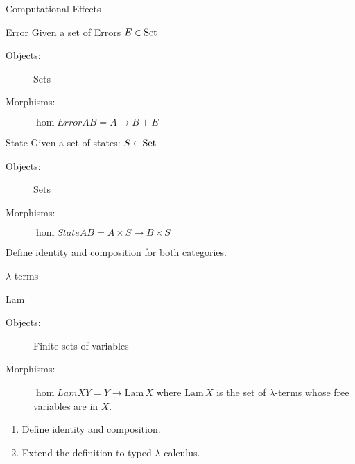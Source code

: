 \documentclass[handout]{beamer}
\begin{document}
\begin{frame}{Computational Effects}

  \begin{block}{Error}
    Given a set of Errors $E\in\mathrm{Set}$
    \begin{description}
    \item[Objects:] Sets
    \item[Morphisms:] $\hom{Error}{A}{B} = A \to B+E$
    \end{description}
  \end{block}

  \pause
  \begin{block}{State}
    Given a set of states: $S\in\mathrm{Set}$
    \begin{description}
    \item[Objects:] Sets
    \item[Morphisms:] $\hom{State}{A}{B} = A\times S \to B\times S$
    \end{description}
  \end{block}

  \pause
  \begin{exercise}
    Define identity and composition for both categories.
  \end{exercise}

\end{frame}

\begin{frame}{$\lambda$-terms}

  \begin{block}{Lam}
   \begin{description}
   \item[Objects:] Finite sets of variables
    \item[Morphisms:] 
      $\hom{Lam}{X}{Y} = Y \to \mathrm{Lam}\,X$
      where $\mathrm{Lam}\,X$ is the set of $\lambda$-terms whose free
      variables are in $X$.
     \end{description}
  \end{block}

  \pause
  \begin{exercise}
    \begin{enumerate}
    \item Define identity and composition.
    \item Extend the definition to typed $\lambda$-calculus.
    \end{enumerate}
  \end{exercise}

\end{frame}
\end{document}
